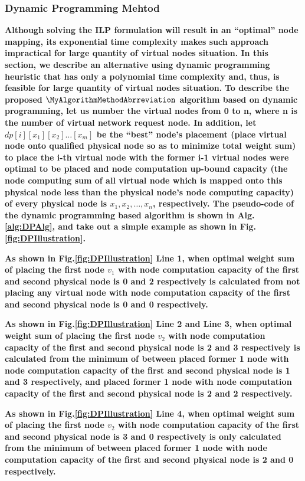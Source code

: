 \subsubsection{Dynamic Programming Mehtod}
\label{lab:DynamicProgrammingEquation}
\textbf{
Although solving the ILP formulation will result in an “optimal” node mapping, its exponential time complexity makes such approach impractical for large quantity of virtual nodes situation. In this section, we describe an alternative using dynamic programming heuristic that has only a polynomial time complexity and, thus, is feasible for large quantity of virtual nodes situation.
}
\textbf{
To describe the proposed $\MyAlgorithmMethodAbrreviation$ algorithm based on dynamic programming, let us number the virtual nodes from 0 to n, where n is the number of virtual network request node. In addition, let $dp[i][{x_1}][{x_2}] \ldots [{x_m}]$ be the “best” node's placement (place virtual node onto qualified physical node so as to minimize total weight sum) to place the i-th virtual node with the former i-1 virtual nodes were optimal to be placed and node computation up-bound capacity (the node computing sum of all virtual node which is mapped onto this physical node less than the physical node's node computing capacity) of every physical node is $x_1,x_2,\ldots,x_n$, respectively.  The pseudo-code of the dynamic programming based algorithm is shown in Alg.\ref{alg:DPAlg}, and take out a simple example as shown in Fig.\ref{fig:DPIllustration}.
}



\textbf{
As shown in Fig.\ref{fig:DPIllustration} Line 1, when optimal weight sum of placing the first node $v_1$ with node computation capacity of the first and second physical node is 0 and 2 respectively is calculated from not placing any virtual node with node computation capacity of the first and second physical node is 0 and 0 respectively.
}

\textbf{
As shown in Fig.\ref{fig:DPIllustration} Line 2 and Line 3, when optimal weight sum of placing the first node $v_2$ with node computation capacity of the first and second physical node is 2 and 3 respectively is calculated   from the minimum of between placed former 1 node with node computation capacity of the first and second physical node is 1 and 3 respectively, and placed former 1 node with node computation capacity of the first and second physical node is 2 and 2 respectively.
}

\textbf{
As shown in Fig.\ref{fig:DPIllustration} Line 4, when optimal weight sum of placing the first node $v_2$ with node computation capacity of the first and second physical node is 3 and 0 respectively is only calculated   from the minimum of between placed former 1 node with node computation capacity of the first and second physical node is 2 and 0 respectively.
}

